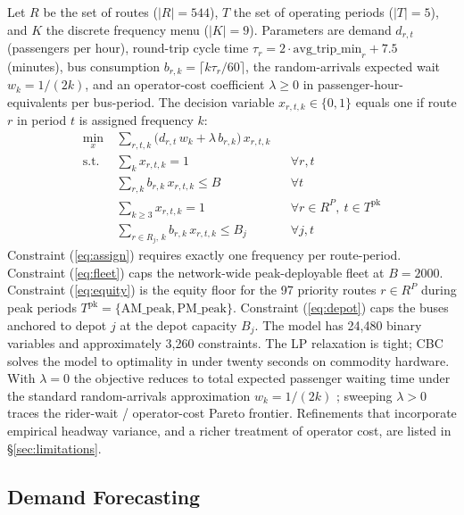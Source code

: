 \documentclass[a4paper,twoside]{article}
\begin{document}
Let $R$ be the set of routes ($|R|=544$), $T$ the set of operating
periods ($|T|=5$), and $K$ the discrete frequency menu ($|K|=9$).
Parameters are demand $d_{r,t}$ (passengers per hour), round-trip
cycle time $\tau_r = 2 \cdot \mathrm{avg\_trip\_min}_r + 7.5$
(minutes), bus consumption
$b_{r,k} = \lceil k \tau_r / 60 \rceil$, the random-arrivals
expected wait $w_k = 1/(2k)$, and an operator-cost coefficient
$\lambda \geq 0$ in passenger-hour-equivalents per bus-period.
The decision variable $x_{r,t,k} \in \{0,1\}$ equals one if route
$r$ in period $t$ is assigned frequency $k$:
\begin{align}
\min_{x}\ & \sum_{r,t,k}
  \bigl(d_{r,t}\, w_k + \lambda\, b_{r,k}\bigr)\, x_{r,t,k}
                                             \label{eq:obj}\\
\text{s.t.}\ & \sum_{k} x_{r,t,k} = 1
  && \forall r,t                             \label{eq:assign}\\
& \sum_{r,k} b_{r,k}\, x_{r,t,k} \leq B
  && \forall t                               \label{eq:fleet}\\
& \sum_{k \geq 3} x_{r,t,k} = 1
  && \forall r \in R^{P},\ t \in T^{\mathrm{pk}}
                                             \label{eq:equity}\\
& \sum_{r \in R_j,\,k} b_{r,k}\, x_{r,t,k} \leq B_j
  && \forall j,t                             \label{eq:depot}
\end{align}
Constraint (\ref{eq:assign}) requires exactly one frequency per
route-period. Constraint (\ref{eq:fleet}) caps the network-wide
peak-deployable fleet at $B = 2000$. Constraint (\ref{eq:equity})
is the equity floor for the 97 priority routes $r \in R^P$ during
peak periods $T^{\mathrm{pk}} = \{\mathrm{AM\_peak},
\mathrm{PM\_peak}\}$. Constraint (\ref{eq:depot}) caps the buses
anchored to depot $j$ at the depot capacity $B_j$. The model has
24{,}480 binary variables and approximately 3{,}260 constraints.
The LP relaxation is tight; CBC solves the model to optimality in
under twenty seconds on commodity hardware. With $\lambda = 0$
the objective reduces to total expected passenger waiting time
under the standard random-arrivals approximation $w_k = 1/(2k)$
\cite{furth1981setting}; sweeping $\lambda > 0$ traces the
rider-wait / operator-cost Pareto frontier. Refinements that
incorporate empirical headway variance, and a richer treatment of
operator cost, are listed in \S\ref{sec:limitations}.

\subsection{Demand Forecasting}
\label{sec:forecast}
\end{document}
